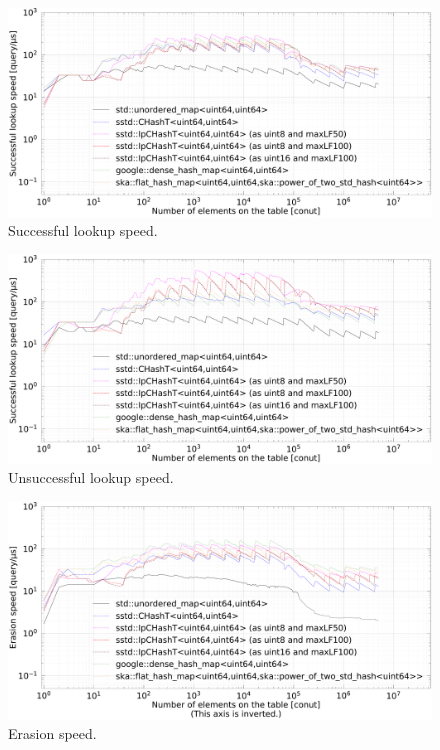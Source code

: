 \begin{figure}[h]
  \hspace{-3mm}
  \includegraphics[scale=0.24]{./fig_bench/find_successful_lookup_med.pdf}
  \caption{ Successful lookup speed. }
  \label{fig_bench_insert}
\end{figure}

\begin{figure}[h]
  \hspace{-3mm}
  \includegraphics[scale=0.24]{./fig_bench/find_unsuccessful_lookup_med.pdf}
  \caption{ Unsuccessful lookup speed. }
  \label{fig_bench_insert}
\end{figure}

\begin{figure}[h]
  \hspace{-3mm}
  \includegraphics[scale=0.24]{./fig_bench/erase_med.pdf}
  \caption{ Erasion speed. }
  \label{fig_bench_insert}
\end{figure}
















